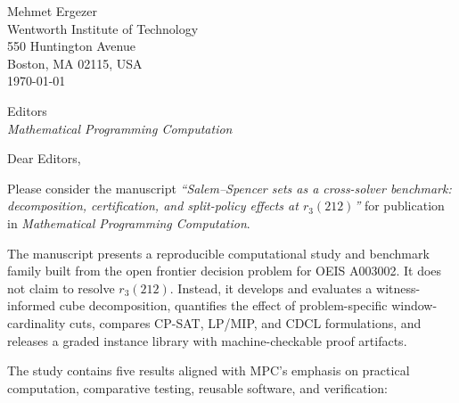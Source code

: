 \documentclass[10pt]{article}
\begin{document}
\begin{flushright}
Mehmet Ergezer\\
Wentworth Institute of Technology\\
550 Huntington Avenue\\
Boston, MA 02115, USA\\
\today
\end{flushright}

Editors\\
\textit{Mathematical Programming Computation}

Dear Editors,

Please consider the manuscript
\textit{``Salem--Spencer sets as a cross-solver benchmark: decomposition,
certification, and split-policy effects at $r_3(212)$''}
for publication in \textit{Mathematical Programming Computation}.

The manuscript presents a reproducible computational study and benchmark
family built from the open frontier decision problem for OEIS A003002. It does
not claim to resolve $r_3(212)$. Instead, it develops and evaluates a
witness-informed cube decomposition, quantifies the effect of
problem-specific window-cardinality cuts, compares CP-SAT, LP/MIP, and CDCL
formulations, and releases a graded instance library with machine-checkable
proof artifacts.

The study contains five results aligned with MPC's emphasis on practical
computation, comparative testing, reusable software, and verification:
\end{document}
